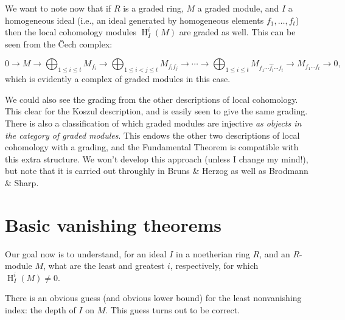 \documentclass[11pt]{book}
\numberwithin{equation}{section}
\numberwithin{theorem}{chapter}
\theoremstyle{definition}
\newtheorem*{basic properties}{Basic Properties}
\newtheorem*{Important Remark}{Important Remark}
\theoremstyle{remark}
\newcommand{\cC}{\v{C}}
\renewcommand{\H}{\operatorname{H}}
\begin{document}
We want to note now that if $R$ is a graded ring, $M$ a graded module, and $I$ a homogeneous ideal (i.e., an ideal generated by homogeneous elements $f_1,\dots,f_t$) then the local cohomology modules $\H^i_I(M)$ are graded as well. This can be seen from the \cC ech complex:

\[ 0 \to M \to \bigoplus_{1\leq i \leq t} M_{f_i} \to \bigoplus_{1\leq i < j \leq t} M_{f_i f_j} \to \cdots \to \bigoplus_{1\leq i \leq t} M_{f_1
	\cdots \widehat{f_i} \cdots f_t} \to M_{f_1\cdots f_t} \to 0,  \]
which is evidently a complex of graded modules in this case.

We could also see the grading from the other descriptions of local cohomology. This clear for the Koszul description, and is easily seen to give the same grading. There is also a classification of which graded modules are injective \emph{as objects in the category of graded modules}. This endows the other two descriptions of local cohomology with a grading, and the Fundamental Theorem is compatible with this extra structure. We won't develop this approach (unless I change my mind!), but note that it is carried out throughly in Bruns \& Herzog as well as Brodmann \& Sharp.


\section{Basic vanishing theorems}

Our goal now is to understand, for an ideal $I$ in a noetherian ring $R$, and an $R$-module $M$, what are the least and greatest $i$, respectively, for which $\H^i_I(M)\neq 0$.

There is an obvious guess (and obvious lower bound) for the least nonvanishing index: the depth of $I$ on $M$. This guess turns out to be correct.
\end{document}
